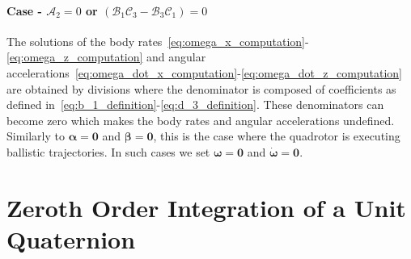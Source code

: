 \documentclass[10pt,a4paper,fleqn]{article}
\newcommand{\bVec}[1]{\mathbf{#1}}
\newcommand{\bodyrate}[0]{\omega} %
\newcommand{\bodyrates}[0]{\boldsymbol{\bodyrate}} %
\begin{document}
\paragraph{Case - $\mathcal{A}_2 = 0$ or $\left( \mathcal{B}_1 \mathcal{C}_3 - \mathcal{B}_3 \mathcal{C}_1 \right) = 0$}

The solutions of the body rates~\eqref{eq:omega_x_computation}-\eqref{eq:omega_z_computation} and angular accelerations~\eqref{eq:omega_dot_x_computation}-\eqref{eq:omega_dot_z_computation} are obtained by divisions where the denominator is composed of coefficients as defined in~\eqref{eq:b_1_definition}-\eqref{eq:d_3_definition}.
These denominators can become zero which makes the body rates and angular accelerations undefined.
Similarly to $\boldsymbol{\alpha} = \bVec{0}$ and $\boldsymbol{\beta} = \bVec{0}$, this is the case where the quadrotor is executing ballistic trajectories.
In such cases we set $\bodyrates = \bVec{0}$ and $\dot{\bodyrates} = \bVec{0}$.

\section{Zeroth Order Integration of a Unit Quaternion} \label{sec:appquatint}
\end{document}
